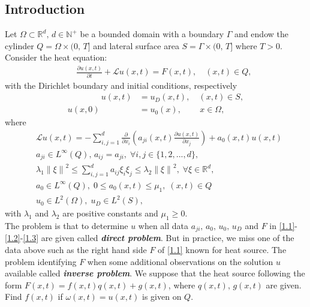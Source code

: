 \documentclass[notitlepage,a4paper,fleqn,9pt]{icmfarticle}
\begin{document}
\begin{multicols}{2}
\section{Introduction}
Let $\Omega \subset \mathbb{R}^d,\, d\in \mathbb{N^+}$ be a bounded domain with a boundary $\Gamma$ and endow the cylinder $Q=\Omega\times (0,\, T]$ and lateral surface area $S=\Gamma \times (0,\, T]$ where $T>0$. 
\\
Consider the heat equation:
\begin{align}\label{1.1}
	\qquad\frac{\partial u(x, t)}{\partial t}+\mathcal{L}u(x, t)=F(x, t), \quad(x, t)\in Q,
\end{align}
with the Dirichlet boundary and initial conditions, respectively
\begin{align}
	\qquad\qquad u(x, t)&=u_D(x, t),\quad(x, t)\in S, \label{1.2}\\
	u(x, 0)&=u_0(x),\quad\quad\, x\in \Omega,\label{1.3}
\end{align}
where
\begin{align*}
	&\mathcal{L}u(x, t) = -\sum_{i, j=1}^{d}\frac{\partial}{\partial x_i}\left(a_{ji}(x, t)\frac{\partial u(x, t)}{\partial x_j}\right)+a_0(x, t)u(x, t)\\
	&a_{ji}\in L^{\infty}(Q),\, a_{ij}=a_{ji},\; \forall i, j\in \{1, 2, ..., d\},\\
	&\lambda_1\left\|\xi\right\|^2\leq \sum_{i, j=1}^{d}a_{ij}\xi_i\xi_j\leq \lambda_2\left\|\xi\right\|^2,\; \forall \xi\in\mathbb{R}^d,\\
	&a_0\in L^{\infty}(Q),\; 0\leq a_0(x, t)\leq \mu_1,\; (x, t)\in Q\\ 
	&u_0\in L^2(\Omega),\;u_D\in L^2(S),
\end{align*}
with $\lambda_1$ and $\lambda_2$ are positive constants and $\mu_1\geq 0$.
\\
The problem is that to determine $u$ when all data $a_{ji},\,a_0,\,u_0,\,u_D$ and $F$ in \eqref{1.1}-\eqref{1.2}-\eqref{1.3} are given called \textbf{\textit{direct problem}}. But in practice, we miss one of the data above such as  the right hand side $F$ of \eqref{1.1} known for heat source. The problem identifying $F$ when some additional observations on the solution $u$ available called \textbf{\textit{inverse problem}}. We suppose that the heat source following the form $F(x, t)=f(x, t)q(x, t)+g(x, t)$, where $q(x, t),\, g(x, t)$ are given. Find $f(x, t)$ if $\omega(x, t)=u(x, t)$ is given on $Q$. 

\end{multicols}
\end{document}
